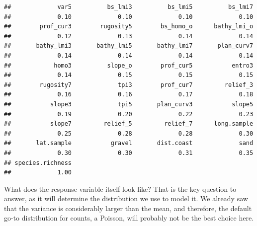 \documentclass[
]{book}
\newenvironment{Shaded}{\begin{snugshade}}{\end{snugshade}}
\newcommand{\AttributeTok}[1]{\textcolor[rgb]{0.13,0.29,0.53}{#1}}
\newcommand{\DecValTok}[1]{\textcolor[rgb]{0.00,0.00,0.81}{#1}}
\newcommand{\FunctionTok}[1]{\textcolor[rgb]{0.13,0.29,0.53}{\textbf{#1}}}
\newcommand{\NormalTok}[1]{#1}
\newcommand{\SpecialCharTok}[1]{\textcolor[rgb]{0.81,0.36,0.00}{\textbf{#1}}}
\newcommand{\StringTok}[1]{\textcolor[rgb]{0.31,0.60,0.02}{#1}}
\begin{document}
\begin{verbatim}
##             var5          bs_lmi3          bs_lmi5          bs_lmi7 
##             0.10             0.10             0.10             0.10 
##        prof_cur3        rugosity5        bs_homo_o      bathy_lmi_o 
##             0.12             0.13             0.14             0.14 
##       bathy_lmi3       bathy_lmi5       bathy_lmi7       plan_curv7 
##             0.14             0.14             0.14             0.14 
##            homo3          slope_o        prof_cur5           entro3 
##             0.14             0.15             0.15             0.15 
##        rugosity7             tpi3        prof_cur7         relief_3 
##             0.16             0.16             0.17             0.18 
##           slope3             tpi5       plan_curv3           slope5 
##             0.19             0.20             0.22             0.23 
##           slope7         relief_5         relief_7      long.sample 
##             0.25             0.28             0.28             0.30 
##       lat.sample           gravel       dist.coast             sand 
##             0.30             0.30             0.31             0.35 
## species.richness 
##             1.00
\end{verbatim}

What does the response variable itself look like? That is the key question to answer, as it will determine the distribution we use to model it. We already saw that the variance is considerably larger than the mean, and therefore, the default go-to distribution for counts, a Poisson, will probably not be the best choice here.

\begin{Shaded}
\end{Shaded}
\end{document}
